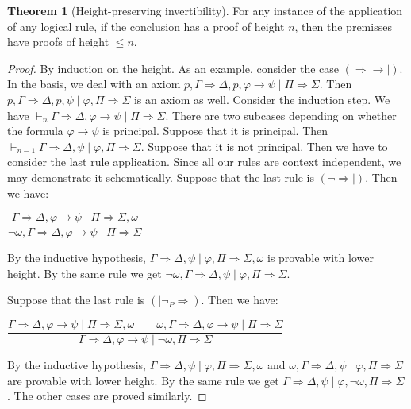 \documentclass[11pt,a4paper,titlepage]{article}
\theoremstyle{definition}
\newtheorem{theorem}{\textbf{Theorem}}
\newcommand{\3}{\vspace{.3in}}
\newcommand{\2}{\vspace{.2in}}
\newcommand{\1}{\vspace{.1in}}
\newcommand{\5}{\vspace{.05in}}
\begin{document}
\begin{theorem}[Height-preserving invertibility]\label{Invertability}
For any instance of the application
of any logical rule, if the conclusion has a proof of height $ n $, then the premisses have
proofs of height $\leqslant n $.	
\end{theorem}
\begin{proof}
By induction on the height.	As an example, consider the case $ (\Rightarrow\rightarrow\mid) $. In the basis, we deal with an axiom $ p,\Gamma\Rightarrow\Delta,p,\varphi\rightarrow\psi\mid\Pi\Rightarrow\Sigma $. Then $ p,\Gamma\Rightarrow\Delta,p,\psi\mid\varphi,\Pi\Rightarrow\Sigma $ is an axiom as well. Consider the induction step. We have  $\vdash_n\Gamma\Rightarrow\Delta,\varphi\rightarrow\psi\mid\Pi\Rightarrow\Sigma $. There are two subcases depending on whether the formula $ \varphi\rightarrow\psi $ is principal. Suppose that it is principal. Then $\vdash_{n-1}\Gamma\Rightarrow\Delta,\psi\mid\varphi,\Pi\Rightarrow\Sigma $. Suppose that it is not principal. Then we have to consider the last rule application. Since all our rules are context independent, we may demonstrate it schematically. Suppose that the last rule is $ (\neg \Rightarrow\mid) $. Then we have: 
\begin{center}
	$ \dfrac{\Gamma\Rightarrow\Delta,\varphi\rightarrow\psi\mid\Pi\Rightarrow\Sigma,\omega}{\neg\omega,\Gamma\Rightarrow\Delta,\varphi\rightarrow\psi\mid\Pi\Rightarrow\Sigma} $
\end{center}

By the inductive hypothesis, $ \Gamma\Rightarrow\Delta,\psi\mid\varphi,\Pi\Rightarrow\Sigma,\omega $ is provable with lower height. By the same rule we get $ \neg\omega,\Gamma\Rightarrow\Delta,\psi\mid\varphi,\Pi\Rightarrow\Sigma $.

Suppose that the last rule is $(\mid\neg_P\Rightarrow)$. Then we have: 
\begin{center}
	$ \dfrac{\Gamma\Rightarrow\Delta,\varphi\rightarrow\psi\mid\Pi\Rightarrow\Sigma,\omega\qquad\omega,\Gamma\Rightarrow\Delta,\varphi\rightarrow\psi\mid\Pi\Rightarrow\Sigma}{\Gamma\Rightarrow\Delta,\varphi\rightarrow\psi\mid\neg\omega,\Pi\Rightarrow\Sigma} $
\end{center}

By the inductive hypothesis, $ \Gamma\Rightarrow\Delta,\psi\mid\varphi,\Pi\Rightarrow\Sigma,\omega $ and $ \omega,\Gamma\Rightarrow\Delta,\psi\mid\varphi,\Pi\Rightarrow\Sigma $ are provable with lower height. By the same rule we get $ \Gamma\Rightarrow\Delta,\psi\mid\varphi,\neg\omega,\Pi\Rightarrow\Sigma $. The other cases are proved similarly.
\end{proof}
\end{document}
